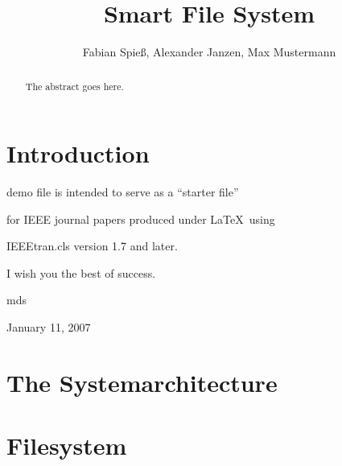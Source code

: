 \documentclass[journal]{IEEEtran}
\begin{document}
\title{Smart File System}



\author{Fabian Spie\ss, Alexander Janzen, Max Mustermann}

        


\maketitle





\begin{abstract}


The abstract goes here.

\end{abstract}



\IEEEpeerreviewmaketitle



\tableofcontents





\section{Introduction}

 demo file is intended to serve as a ``starter file''

for IEEE journal papers produced under \LaTeX\ using

IEEEtran.cls version 1.7 and later.

I wish you the best of success.



\hfill mds

 

\hfill January 11, 2007



\section{The Systemarchitecture}







\section{Filesystem}
\end{document}
